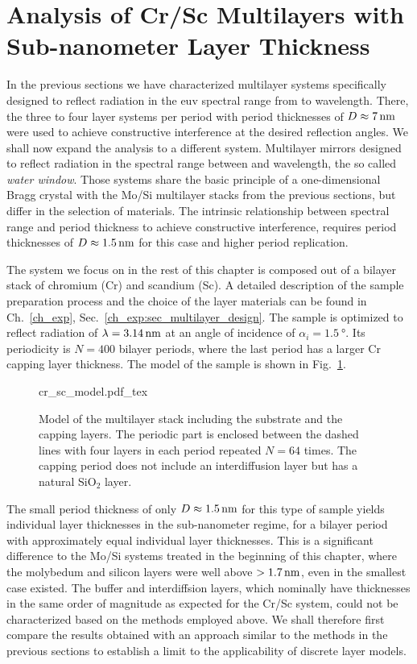  





\section{Analysis of Cr/Sc Multilayers with Sub-nanometer Layer Thickness}
In the previous sections we have characterized multilayer systems specifically designed to reflect radiation in the \gls{euv} spectral range from  to  wavelength. There, the three to four layer systems per period with period thicknesses of $D\approx\nm{7}$ were used to achieve constructive interference at the desired reflection angles. We shall now expand the analysis to a different system. Multilayer mirrors designed to reflect radiation in the spectral range between  and  wavelength, the so called \emph{water window}. Those systems share the basic principle of a one-dimensional Bragg crystal with the Mo/Si multilayer stacks from the previous sections, but differ in the selection of materials. The intrinsic relationship between spectral range and period thickness to achieve constructive interference, requires period thicknesses of $D\approx \nm{1.5}$ for this case and higher period replication.


The system we focus on in the rest of this chapter is composed out of a bilayer stack of chromium (Cr) and scandium (Sc). A detailed description of the sample preparation process and the choice of the layer materials can be found in Ch.~\ref{ch_exp}, Sec.~\ref{ch_exp:sec_multilayer_design}. The sample is optimized to reflect radiation of $\lambda = \nm{3.14}$ at an angle of incidence of $\alpha_i = \SI{1.5}{\degree}$. Its periodicity is $N=400$ bilayer periods, where the last period has a larger Cr capping layer thickness. The model of the sample is shown in Fig.~\ref{ch_spec:fig_Cr_Sc_model}.
\begin{figure}[htbp]
    \def\svgwidth{0.7\textwidth}
    \selectfont\footnotesize
    {cr_sc_model.pdf_tex}
    \caption{Model of the multilayer stack including the substrate and the capping layers. The periodic part is enclosed between the dashed lines with four layers in each period repeated $N=64$ times. The capping period does not include an interdiffusion layer but has a natural SiO$_2$ layer.}
    \label{ch_spec:fig_Cr_Sc_model}
\end{figure}
The small period thickness of only $D\approx\nm{1.5}$ for this type of sample yields individual layer thicknesses in the sub-nanometer regime, for a bilayer period with approximately equal individual layer thicknesses. This is a significant difference to the Mo/Si systems treated in the beginning of this chapter, where the molybedum and silicon layers were well above $>\nm{1.7}$, even in the smallest case existed. The buffer and interdiffsion layers, which nominally have thicknesses in the same order of magnitude as expected for the Cr/Sc system, could not be characterized based on the methods employed above. We shall therefore first compare the results obtained with an approach similar to the methods in the previous sections to establish a limit to the applicability of discrete layer models.

